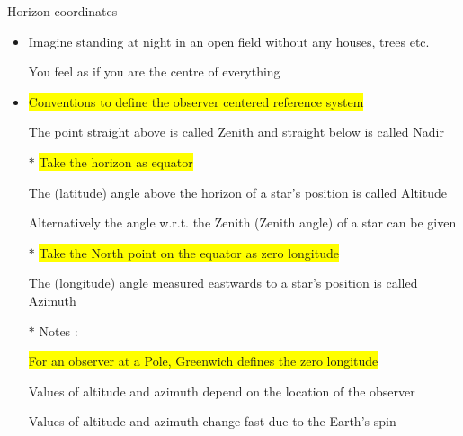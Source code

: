 \Tr
\onecolumn
\begin{center}
{\red Horizon coordinates}
\end{center}
%
\begin{itemize}
\item Imagine standing at night in an open field without any houses, trees etc.
\item[] You feel as if you are the centre of everything
\item \colorbox{yellow}{Conventions to define the observer centered reference system}
\item[] The point straight above is called {\blue Zenith} and straight below is called {\blue Nadir}
\item[$\ast$] \colorbox{yellow}{Take the horizon as equator}
\item[] The (latitude) {\blue angle above the horizon} of a star's position is called {\blue Altitude}
\item[] Alternatively the angle w.r.t. the Zenith ({\blue Zenith angle}) of a star can be given
\item[$\ast$] \colorbox{yellow}{Take the North point on the equator as zero longitude}
\item[] The (longitude) {\blue angle measured eastwards} to a star's position is called {\blue Azimuth}
\item[$\ast$] Notes :
\item[] \colorbox{yellow}{For an observer at a Pole, Greenwich defines the zero longitude}
\item[] Values of altitude and azimuth depend on the location of the observer
\item[] Values of altitude and azimuth change fast due to the Earth's spin
\end{itemize}

